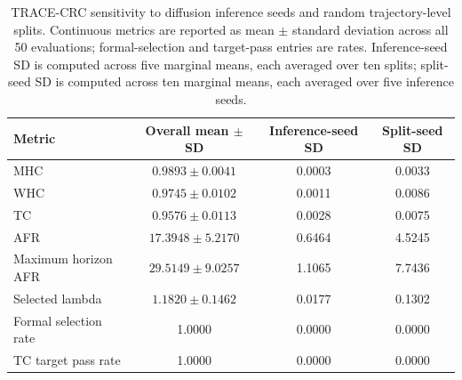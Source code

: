 \begin{table}[!htbp]
\centering
\scriptsize
\caption{TRACE-CRC sensitivity to diffusion inference seeds and random trajectory-level splits. Continuous metrics are reported as mean $\pm$ standard deviation across all 50 evaluations; formal-selection and target-pass entries are rates. Inference-seed SD is computed across five marginal means, each averaged over ten splits; split-seed SD is computed across ten marginal means, each averaged over five inference seeds.}
\label{tab:trace-factor-sensitivity}
\begin{tabular}{lccc}
\toprule
Metric & Overall mean $\pm$ SD & Inference-seed SD & Split-seed SD \\
\midrule
MHC & $0.9893 \pm 0.0041$ & 0.0003 & 0.0033 \\
WHC & $0.9745 \pm 0.0102$ & 0.0011 & 0.0086 \\
TC & $0.9576 \pm 0.0113$ & 0.0028 & 0.0075 \\
AFR & $17.3948 \pm 5.2170$ & 0.6464 & 4.5245 \\
Maximum horizon AFR & $29.5149 \pm 9.0257$ & 1.1065 & 7.7436 \\
Selected lambda & $1.1820 \pm 0.1462$ & 0.0177 & 0.1302 \\
Formal selection rate & 1.0000 & 0.0000 & 0.0000 \\
TC target pass rate & 1.0000 & 0.0000 & 0.0000 \\
\bottomrule
\end{tabular}
\end{table}
